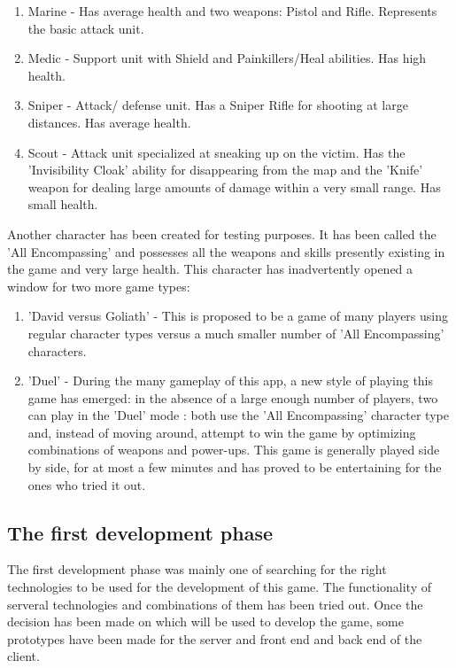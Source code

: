 \begin{enumerate}
  \item Marine - Has average health and two weapons: Pistol and Rifle.
  Represents the basic attack unit.
  
  \item Medic - Support unit with Shield and Painkillers/Heal abilities. Has
  high health.
   
  \item Sniper - Attack/ defense unit. Has a Sniper Rifle for shooting at large
  distances. Has average health.
  
  \item Scout - Attack unit specialized at sneaking up on the victim. Has the
  'Invisibility Cloak' ability for disappearing from the map and the 'Knife'
  weapon for dealing large amounts of damage within a very small range. Has
  small health.
  
\end{enumerate}

Another character has been created for testing purposes. It has been called the
'All Encompassing' and possesses all the weapons and skills presently existing
in the game and very large health. This character has inadvertently opened a window
for two more game types:

\begin{enumerate}
  \item 'David versus Goliath' - This is proposed to be a game of many players
  using regular character types versus a much smaller number of 'All
  Encompassing' characters.
  
  \item 'Duel' - During the many gameplay of this app, a new style of playing
  this game has emerged: in the absence of a large enough number of players, two
  can play in the 'Duel' mode : both use the 'All Encompassing' character type
  and, instead of moving around, attempt to win the game by optimizing  
  combinations of weapons and power-ups. This game is generally played side by
  side, for at most a few minutes and has proved to be entertaining for the ones
  who tried it out.
\end{enumerate}



\subsection{The first development phase}

The first development phase was mainly one of searching for the right
technologies to be used for the development of this game. The functionality
of serveral technologies and combinations of them has been tried out. Once
the decision has been made on which will be used to develop the game, some
prototypes have been made for the server and front end and back end of the
client.\newline

